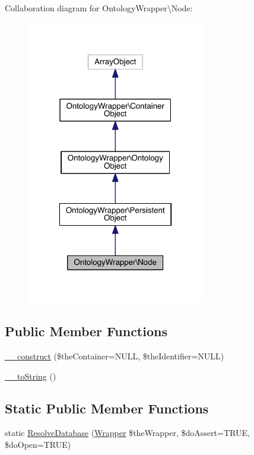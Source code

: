 Collaboration diagram for Ontology\-Wrapper\textbackslash{}Node\-:
\nopagebreak
\begin{figure}[H]
\begin{center}
\leavevmode
\includegraphics[width=220pt]{class_ontology_wrapper_1_1_node__coll__graph}
\end{center}
\end{figure}
\subsection*{Public Member Functions}
\begin{DoxyCompactItemize}
\item 
\hyperlink{class_ontology_wrapper_1_1_node_aa17f2c63c36277160e883deeb0b96134}{\-\_\-\-\_\-construct} (\$the\-Container=N\-U\-L\-L, \$the\-Identifier=N\-U\-L\-L)
\item 
\hyperlink{class_ontology_wrapper_1_1_node_a69d608a44e2c93d58f328f235be1f01a}{\-\_\-\-\_\-to\-String} ()
\end{DoxyCompactItemize}
\subsection*{Static Public Member Functions}
\begin{DoxyCompactItemize}
\item 
static \hyperlink{class_ontology_wrapper_1_1_node_af8ad265b863a59718d1878d398417006}{Resolve\-Database} (\hyperlink{class_ontology_wrapper_1_1_wrapper}{Wrapper} \$the\-Wrapper, \$do\-Assert=T\-R\-U\-E, \$do\-Open=T\-R\-U\-E)
\end{DoxyCompactItemize}
